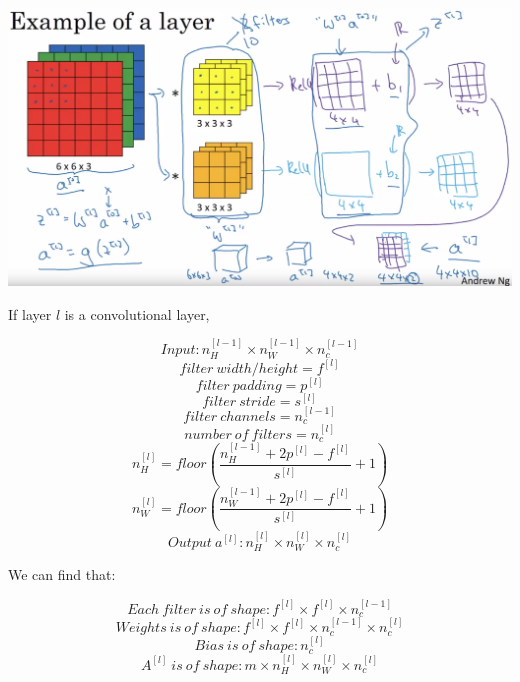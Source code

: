 \documentclass{article}
\begin{document}
\begin{center}
\includegraphics[scale=0.2]{./images/one_layer_of_a_convolutional_net.png}
\end{center}

\noindent If layer \(l\) is a convolutional layer,

\[Input: n_{H}^{[l - 1]} \times n_{W}^{[l - 1]} \times n_{c}^{[l - 1]}\]
\[filter \ width/height = f^{[l]}\]
\[filter \ padding = p^{[l]}\]
\[filter \ stride = s^{[l]}\]
\[filter \ channels = n_{c}^{[l - 1]}\]
\[number \ of \ filters = n_{c}^{[l]}\]
\[n_{H}^{[l]} = floor(\frac{n_{H}^{[l - 1]} + 2p^{[l]} - f^{[l]}}{s^{[l]}} + 1)\]
\[n_{W}^{[l]} = floor(\frac{n_{W}^{[l - 1]} + 2p^{[l]} - f^{[l]}}{s^{[l]}} + 1)\]
\[Output \ a^{[l]}: n_{H}^{[l]} \times n_{W}^{[l]} \times n_{c}^{[l]}\]

\noindent We can find that:

\[Each \ filter \ is \ of \ shape: f^{[l]} \times f^{[l]} \times n_{c}^{[l - 1]}\]
\[Weights \ is \ of \ shape: f^{[l]} \times f^{[l]} \times n_{c}^{[l - 1]} \times n_{c}^{[l]}\]
\[Bias \ is \ of \ shape: n_{c}^{[l]}\]
\[A^{[l]} \ is \ of \ shape: m \times n_{H}^{[l]} \times n_{W}^{[l]} \times n_{c}^{[l]}\]

\printindex
\end{document}
